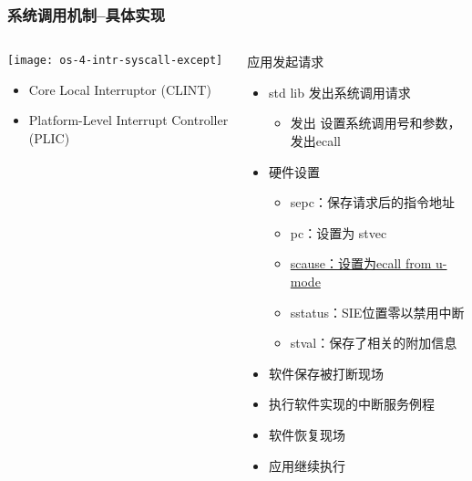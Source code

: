 \begin{frame}[plain,t]
	\frametitle{系统调用机制--具体实现}
	\begin{columns}
		
		\begin{column}{0.4\textwidth}
			\centering
			\texttt{[image: os-4-intr-syscall-except]}
			\begin{itemize} \small
				\item Core Local	Interruptor (CLINT)
				\item Platform-Level Interrupt Controller (PLIC)
			\end{itemize}
			
		\end{column}
		
		\begin{column}{0.5\textwidth}
			
			应用发起请求  \pause
			\begin{itemize} \small 
				\item std lib 发出系统调用请求
				\begin{itemize} \small 
					\item 发出 设置系统调用号和参数，发出ecall	 

				\end{itemize} \pause				
				\item 硬件设置
				\begin{itemize} \small 
					\item sepc：保存请求后的指令地址	
					\item pc：设置为 stvec
					\item \underline{scause：设置为ecall from u-mode}
					\item sstatus：SIE位置零以禁用中断					
					\item stval：保存了相关的附加信息
				\end{itemize}  \pause
				\item 软件保存被打断现场\pause
				\item 执行软件实现的中断服务例程
				\item 软件恢复现场  \pause
				\item 应用继续执行
				
			\end{itemize}
			
		\end{column}
		
	\end{columns}
	
\end{frame}	


